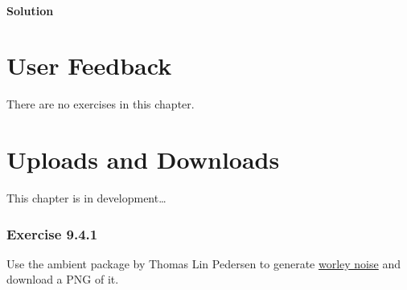\documentclass[]{book}
\newenvironment{Shaded}{\begin{snugshade}}{\end{snugshade}}
\newcommand{\ControlFlowTok}[1]{\textcolor[rgb]{0.13,0.29,0.53}{\textbf{#1}}}
\newcommand{\KeywordTok}[1]{\textcolor[rgb]{0.13,0.29,0.53}{\textbf{#1}}}
\newcommand{\NormalTok}[1]{#1}
\newcommand{\OperatorTok}[1]{\textcolor[rgb]{0.81,0.36,0.00}{\textbf{#1}}}
\newcommand{\StringTok}[1]{\textcolor[rgb]{0.31,0.60,0.02}{#1}}
\begin{document}
\begin{solution}

\hypertarget{solution-2}{%
\subsubsection*{Solution}\label{solution-2}}

\begin{Shaded}
\end{Shaded}

\end{solution}

\hypertarget{user-feedback}{%
\chapter{User Feedback}\label{user-feedback}}

There are no exercises in this chapter.

\hypertarget{uploads-and-downloads}{%
\chapter{Uploads and Downloads}\label{uploads-and-downloads}}

\begin{TODO}

This chapter is in development\ldots{}

\end{TODO}

\hypertarget{exercise-9.4.1}{%
\subsection*{Exercise 9.4.1}\label{exercise-9.4.1}}

Use the ambient package by Thomas Lin Pedersen to generate \href{https://ambient.data-imaginist.com/reference/noise_worley.html}{worley noise} and download a PNG of it.
\end{document}
